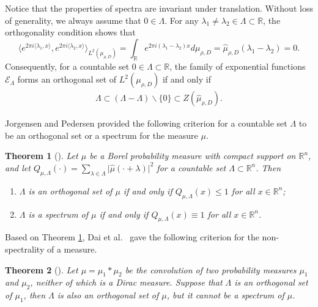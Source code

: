 \documentclass[11pt]{article}
\newtheorem{theorem}{Theorem}[section]
\numberwithin{equation}{section}
\begin{document}
Notice that the properties of spectra are invariant under translation. Without loss of generality, we always assume that $0\in\Lambda$.
For any $\lambda_{1} \neq \lambda_{2}\in\Lambda\subset\mathbb{R}$, the orthogonality condition shows that
$$\langle e^{2\pi i \langle \lambda_{1}, x \rangle},e^{2\pi i \langle \lambda_{2}, x \rangle }\rangle_{L^{2}(\mu_{\rho,D})}=\int _{\mathbb{R}} e^{2\pi i(\lambda_{1}-\lambda_{2})x}d\mu_{\rho,D}=\hat{\mu}_{\rho,D}(\lambda_{1}-\lambda_{2})=0.  $$
Consequently, for a countable set $0\in\Lambda\subset\mathbb{R}$, the family of exponential functions $\mathcal{E}_{\Lambda}$ forms an orthogonal set of $L^{2}(\mu_{\rho,D})$ if and only if
\begin{align}\label{2.3}
	\Lambda \subset (\Lambda-\Lambda)\backslash\{0\}\subset Z(\hat{\mu}_{\rho,D}).
\end{align}

Jorgensen and Pedersen \cite{Jorgensen-Pedersen_1998} provided the following criterion for a countable set $\Lambda$ to be an orthogonal set or a spectrum for the measure $\mu$.


\begin{theorem}[\cite{Jorgensen-Pedersen_1998}] \label{2.15}
	Let $\mu$ be a Borel probability measure with compact support on $\mathbb{R}^n$, and let $Q_{\mu,\Lambda}(\cdot)=\sum_{\lambda \in \Lambda} \vert \hat{\mu}(\cdot + \lambda) \vert ^2$ for a countable set $\Lambda \subset \mathbb{R}^n$. Then
	\begin{enumerate}[\rm(i)]
		\item $\Lambda$ is an orthogonal set of $\mu$ if and only if $Q_{\mu,\Lambda}(x) \le 1$ for all $x\in \mathbb{R}^n$;
		\item $\Lambda$ is a spectrum of $\mu$ if and only if $Q_{\mu,\Lambda}(x) \equiv 1$ for all $x\in \mathbb{R}^n$.
	\end{enumerate}
\end{theorem}

Based on Theorem \ref{2.15}, Dai et al.~\cite{Dai-He-Lau_2014} gave the following criterion for the non-spectrality of a measure.



\begin{theorem}[\cite{Dai-He-Lau_2014}] \label{2.20}
	Let $\mu=\mu_1 \ast \mu_2$ be the convolution of two probability measures $\mu_1$ and $\mu_2$, neither of which is a Dirac measure. Suppose that $\Lambda$ is an orthogonal set of $\mu_1$, then $\Lambda$ is also an orthogonal set of $\mu$, but it cannot be a spectrum of $\mu$.
\end{theorem}
\end{document}
